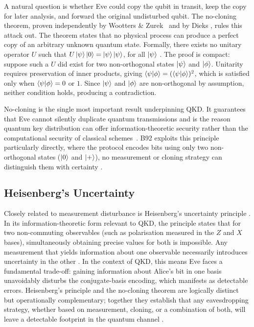 \documentclass[10pt, a4paper]{report}
\begin{document}
A natural question is whether Eve could copy the qubit in transit, keep the copy for later analysis, and forward the original undisturbed qubit. The no-cloning theorem, proven independently by Wootters \& Zurek~\cite{WZ1982} and by Dieks \cite{Dieks1982}, rules this attack out. The theorem states that no physical process can produce a perfect copy of an arbitrary unknown quantum state. Formally, there exists no unitary operator $U$ such that $U\ket{\psi}\ket{0} = \ket{\psi}\ket{\psi}$, for all $\ket{\psi}$ \cite{QKDbible}. The proof is compact: suppose such a $U$ did exist for two non-orthogonal states $\ket{\psi}$ and $\ket{\phi}$. Unitarity requires preservation of inner products, giving $\braket{\psi|\phi} = (\braket{\psi|\phi})^{2}$, which is satisfied only when $\braket{\psi|\phi} = 0$ or $1$. Since $\ket{\psi}$ and $\ket{\phi}$ are non-orthogonal by assumption, neither condition holds, producing a contradiction.

No-cloning is the single most important result underpinning QKD. It guarantees that Eve cannot silently duplicate quantum transmissions and is the reason quantum key distribution can offer information-theoretic security rather than the computational security of classical schemes~\cite{ekertQI}. B92 exploits this principle particularly directly, where the protocol encodes bits using only two non-orthogonal states ($\ket{0}$ and $\ket{+}$), no measurement or cloning strategy can distinguish them with certainty \cite{B92}.

\subsection{Heisenberg's Uncertainty}

Closely related to measurement disturbance is Heisenberg's uncertainty principle \cite{Heisenberg1927}. In its information-theoretic form relevant to QKD, the principle states that for two non-commuting observables (such as polarisation measured in
the $Z$ and $X$ bases), simultaneously obtaining precise values for both is impossible. Any measurement that yields information about one observable necessarily introduces uncertainty in the other \cite{QKDbible}. In the context of QKD, this means Eve faces a fundamental trade-off: gaining information about Alice's bit in one basis unavoidably disturbs the conjugate-basis encoding, which manifests as detectable errors. Heisenberg's principle and the no-cloning theorem are logically distinct but operationally complementary; together they establish that any eavesdropping strategy, whether based on measurement, cloning, or a combination of both, will leave a detectable footprint in the quantum channel \cite{Scarani2009}. 
\end{document}
